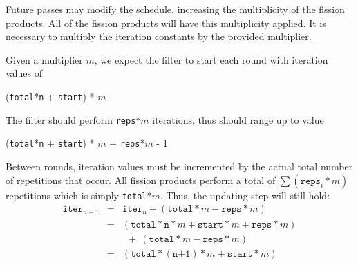 Future passes may modify the schedule, increasing the multiplicity of the fission products.  All of the fission products will have this multiplicity applied. It is necessary to multiply the iteration constants by the provided multiplier.

Given a multiplier $m$, we expect the filter to start each round with iteration values of 
\begin{center}
(\texttt{total}*\texttt{n} + \texttt{start}) * $m$
\end{center}
The filter should perform \texttt{reps}*$m$ iterations, thus should range up to value
\begin{center}
(\texttt{total}*\texttt{n} + \texttt{start}) * $m$ + \texttt{reps}*$m$ - 1
\end{center}

Between rounds, iteration values must be incremented by the actual total number of repetitions that occur.  All fission products perform a total of $\sum(\texttt{reps}_{i}*m)$ repetitions which is simply \texttt{total}*$m$.  Thus, the updating step will still hold:
\begin{eqnarray*}
\texttt{iter}_{n+1} &=& \texttt{iter}_{n} + (\texttt{total}*m - \texttt{reps}*m) \\
&=& (\texttt{total}*\texttt{n}*m + \texttt{start}*m + \texttt{reps}*m) \\
&&  \ \ +\ (\texttt{total}*m - \texttt{reps}*m) \\
&=& (\texttt{total}*(\texttt{n+1})*m + \texttt{start}*m)
\end{eqnarray*}

